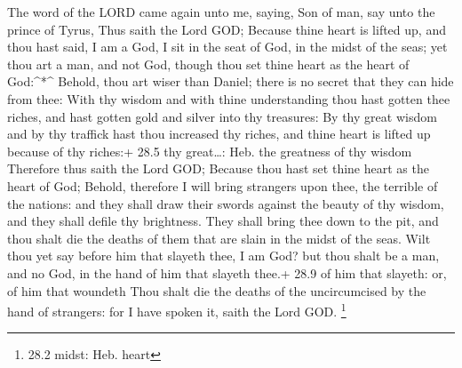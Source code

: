  The word of the LORD came again unto me, saying,
 Son of man, say unto the prince of Tyrus, Thus saith the
Lord GOD; Because thine heart is lifted up, and thou hast said, I am a
God, I sit in the seat of God, in the midst of the seas; yet thou art a
man, and not God, though thou set thine heart as the heart of
God:\^{}*\^{}  Behold, thou art wiser than Daniel; there is
no secret that they can hide from thee:  With thy wisdom and
with thine understanding thou hast gotten thee riches, and hast gotten
gold and silver into thy treasures:  By thy great wisdom and
by thy traffick hast thou increased thy riches, and thine heart is
lifted up because of thy riches:+ 28.5 thy great\ldots: Heb. the
greatness of thy wisdom  Therefore thus saith the Lord GOD;
Because thou hast set thine heart as the heart of God; 
Behold, therefore I will bring strangers upon thee, the terrible of the
nations: and they shall draw their swords against the beauty of thy
wisdom, and they shall defile thy brightness.  They shall
bring thee down to the pit, and thou shalt die the deaths of them that
are slain in the midst of the seas.  Wilt thou yet say
before him that slayeth thee, I am God? but thou shalt be a man, and no
God, in the hand of him that slayeth thee.+ 28.9 of him that slayeth:
or, of him that woundeth  Thou shalt die the deaths of the
uncircumcised by the hand of strangers: for I have spoken it, saith the
Lord GOD. \footnote{28.2 midst: Heb. heart}

